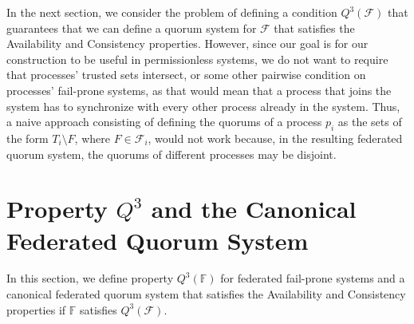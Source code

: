 \documentclass[11pt,letterpaper]{article}
\begin{document}
In the next section, we consider the problem of defining a condition $Q^3(\mathcal{F})$ that guarantees that we can define a quorum system for $\mathcal{F}$ that satisfies the Availability and Consistency properties. %
However, since our goal is for our construction to be useful in permissionless systems, we do not want to require that processes' trusted sets intersect, or some other pairwise condition on processes' fail-prone systems, as that would mean that a process that joins the system has to synchronize with every other process already in the system.
Thus, a naive approach consisting of defining the quorums of a process $p_i$ as the sets of the form $T_i\setminus F$, where $F\in\mathcal{F}_i$, would not work because, in the resulting federated quorum system, the quorums of different processes may be disjoint.

\section{Property \texorpdfstring{$Q^3$}{Q\textasciicircum 3} and the Canonical Federated Quorum System}



In this section, we define property $Q^3(\mathbb{F})$ for federated fail-prone systems and a canonical federated quorum system that satisfies the Availability and Consistency properties if $\mathbb{F}$ satisfies $Q^3(\mathcal{F})$.
\end{document}
